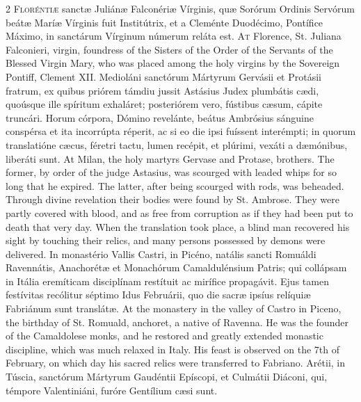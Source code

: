 \begin{paracol}{2}
\lettrine[lines=2]{F}{loréntiæ} sanctæ 
 Juliánæ Falconériæ Vírginis, quæ Sorórum Ordinis Servórum beátæ Maríæ 
 Vírginis fuit Institútrix, et a Cleménte Duodécimo, Pontífice Máximo, in 
 sanctárum Vírginum númerum reláta est.
\switchcolumn
{}
\lettrine[lines=2]{A}{t} Florence, St. Juliana Falconieri, 
 virgin, foundress of the Sisters of the Order of the Servants of the Blessed 
 Virgin Mary, who was placed among the holy virgins by the Sovereign Pontiff, 
 Clement XII.
\switchcolumn*
{}
Medioláni sanctórum 
 Mártyrum Gervásii et Protásii fratrum, ex quibus priórem támdiu jussit 
 Astásius Judex plumbátis cædi, quoúsque ille spíritum exhaláret; posteriórem 
 vero, fústibus cæsum, cápite truncári. Horum córpora, Dómino revelánte, 
 beátus Ambrósius sánguine conspérsa et ita incorrúpta réperit, ac si eo die 
 ipsi fuíssent interémpti; in quorum translatióne cæcus, féretri tactu, lumen 
 recépit, et plúrimi, vexáti a dæmónibus, liberáti sunt.
\switchcolumn
{}
At Milan, the holy martyrs Gervase 
 and Protase, brothers. The former, by order of the judge Astasius, was 
 scourged with leaded whips for so long that he expired. The latter, 
 after being scourged with rods, was beheaded. Through divine 
 revelation their bodies were found by St. Ambrose. They were partly 
 covered with blood, and as free from corruption as if they had been put to 
 death that very day. When the translation took place, a blind man 
 recovered his sight by touching their relics, and many persons possessed by 
 demons were delivered.
\switchcolumn*
{}
In monastério Vallis 
 Castri, in Picéno, natális sancti Romuáldi Ravennátis, Anachorétæ et 
 Monachórum Camaldulénsium Patris; qui collápsam in Itália eremíticam 
 disciplínam restítuit ac mirífice propagávit. Ejus tamen festívitas 
 recólitur séptimo Idus Februárii, quo die sacræ ipsíus relíquiæ Fabriánum 
 sunt translátæ.
\switchcolumn
{}
At the monastery in the valley of 
 Castro in Piceno, the birthday of St. Romuald, anchoret, a native of 
 Ravenna. He was the founder of the Camaldolese monks, and he restored 
 and greatly extended monastic discipline, which was much relaxed in Italy. 
 His feast is observed on the 7th of February, on which day his sacred relics 
 were transferred to Fabriano.
\switchcolumn*
{}
Arétii, in Túscia, 
 sanctórum Mártyrum Gaudéntii Epíscopi, et Culmátii Diáconi, qui, témpore 
 Valentiniáni, furóre Gentílium cæsi sunt.

\end{paracol}
